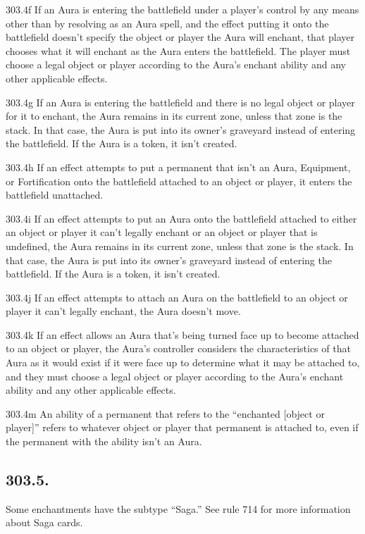 303.4f If an Aura is entering the battlefield under a player’s control by any means other than by resolving as an Aura spell, and the effect putting it onto the battlefield doesn’t specify the object or player the Aura will enchant, that player chooses what it will enchant as the Aura enters the battlefield. The player must choose a legal object or player according to the Aura’s enchant ability and any other applicable effects.

303.4g If an Aura is entering the battlefield and there is no legal object or player for it to enchant, the Aura remains in its current zone, unless that zone is the stack. In that case, the Aura is put into its owner’s graveyard instead of entering the battlefield. If the Aura is a token, it isn’t created.

303.4h If an effect attempts to put a permanent that isn’t an Aura, Equipment, or Fortification onto the battlefield attached to an object or player, it enters the battlefield unattached.

303.4i If an effect attempts to put an Aura onto the battlefield attached to either an object or player it can’t legally enchant or an object or player that is undefined, the Aura remains in its current zone, unless that zone is the stack. In that case, the Aura is put into its owner’s graveyard instead of entering the battlefield. If the Aura is a token, it isn’t created.

303.4j If an effect attempts to attach an Aura on the battlefield to an object or player it can’t legally enchant, the Aura doesn’t move.

303.4k If an effect allows an Aura that’s being turned face up to become attached to an object or player, the Aura’s controller considers the characteristics of that Aura as it would exist if it were face up to determine what it may be attached to, and they must choose a legal object or player according to the Aura’s enchant ability and any other applicable effects.

303.4m An ability of a permanent that refers to the “enchanted [object or player]” refers to whatever object or player that permanent is attached to, even if the permanent with the ability isn’t an Aura.

\subsection*{303.5.}
Some enchantments have the subtype “Saga.” See rule 714 for more information about Saga cards.

